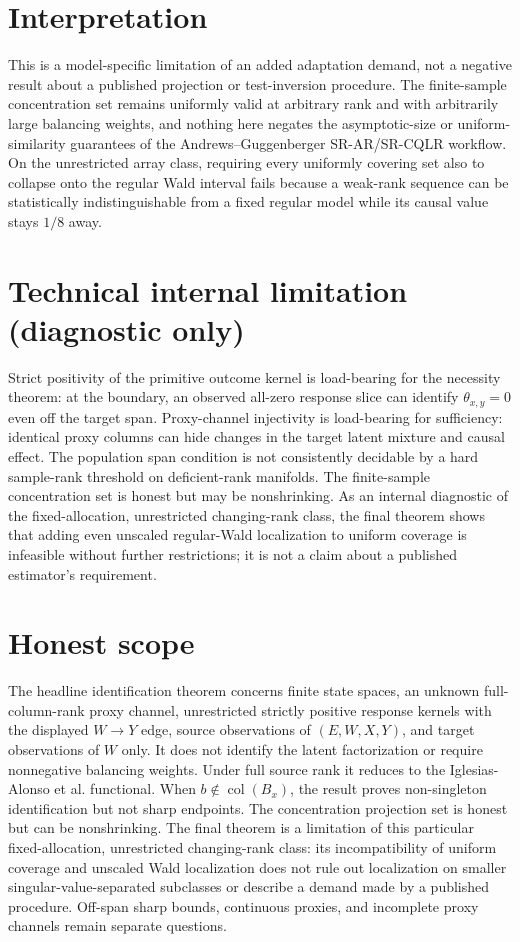 \documentclass{article}
\begin{document}
\section{Interpretation}

This is a model-specific limitation of an added adaptation demand, not a negative result about a published projection or test-inversion procedure. The finite-sample concentration set remains uniformly valid at arbitrary rank and with arbitrarily large balancing weights, and nothing here negates the asymptotic-size or uniform-similarity guarantees of the Andrews--Guggenberger SR-AR/SR-CQLR workflow. On the unrestricted array class, requiring every uniformly covering set also to collapse onto the regular Wald interval fails because a weak-rank sequence can be statistically indistinguishable from a fixed regular model while its causal value stays \(1/8\) away.

\section*{Technical internal limitation (diagnostic only)}

Strict positivity of the primitive outcome kernel is load-bearing for the necessity theorem: at the boundary, an observed all-zero response slice can identify \(\theta_{x,y}=0\) even off the target span. Proxy-channel injectivity is load-bearing for sufficiency: identical proxy columns can hide changes in the target latent mixture and causal effect. The population span condition is not consistently decidable by a hard sample-rank threshold on deficient-rank manifolds. The finite-sample concentration set is honest but may be nonshrinking. As an internal diagnostic of the fixed-allocation, unrestricted changing-rank class, the final theorem shows that adding even unscaled regular-Wald localization to uniform coverage is infeasible without further restrictions; it is not a claim about a published estimator's requirement.

\section{Honest scope}

The headline identification theorem concerns finite state spaces, an unknown full-column-rank proxy channel, unrestricted strictly positive response kernels with the displayed \(W\to Y\) edge, source observations of \((E,W,X,Y)\), and target observations of \(W\) only. It does not identify the latent factorization or require nonnegative balancing weights. Under full source rank it reduces to the Iglesias-Alonso et al. functional. When \(b\notin\operatorname{col}(B_x)\), the result proves non-singleton identification but not sharp endpoints. The concentration projection set is honest but can be nonshrinking. The final theorem is a limitation of this particular fixed-allocation, unrestricted changing-rank class: its incompatibility of uniform coverage and unscaled Wald localization does not rule out localization on smaller singular-value-separated subclasses or describe a demand made by a published procedure. Off-span sharp bounds, continuous proxies, and incomplete proxy channels remain separate questions.
\end{document}
